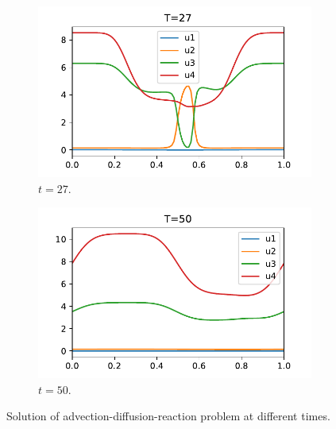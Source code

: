 \documentclass[a4paper]{article}
\numberwithin{equation}{section}
\theoremstyle{plain}
\theoremstyle{definition}
\numberwithin{theorem}{section}
\newcommand{\1}{\mathbbm{1}}
\begin{document}
\begin{figure}
    \begin{subfigure}[b]{0.49\textwidth}
        \includegraphics[width=\textwidth]{plots/ADP_sol_27.pdf}
        \caption{$t=27$.}
        \label{fig:sol_ADP27}
    \end{subfigure}
	\begin{subfigure}[b]{0.49\textwidth}
        \includegraphics[width=\textwidth]{plots/ADP_sol_50.pdf}
        \caption{$t=50$.}
        \label{fig:sol_ADP50}
    \end{subfigure}
    \caption{Solution of advection-diffusion-reaction problem at different times.}\label{fig:Sol_ADP}
\end{figure}
\end{document}

